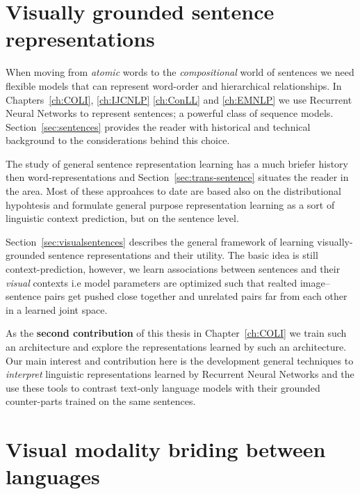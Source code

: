 \section{Visually grounded sentence representations}

When moving from \emph{atomic} words to the \emph{compositional} world of sentences we need flexible
models that can represent word-order and hierarchical relationships.  In Chapters~\ref{ch:COLI}, \ref{ch:IJCNLP}  \ref{ch:ConLL} and \ref{ch:EMNLP} 
we use Recurrent Neural Networks to represent sentences; a powerful class of  sequence models.
Section~\ref{sec:sentences} provides the reader with 
historical and technical background to the considerations behind this choice.

The study of general sentence representation learning has a much briefer history then word-representations
and Section~\ref{sec:trans-sentence} situates the reader in the area. Most of these approahces to date are 
based also on the distributional hypohtesis and formulate general purpose representation learning as a sort of
linguistic context prediction, but on the sentence level. 

Section~\ref{sec:visualsentences}
describes the general framework of learning visually-grounded sentence representations and their utility. 
The basic idea is still context-prediction, however, we learn associations between sentences and their \emph{visual} 
contexts i.e model parameters are optimized such that realted image--sentence 
pairs get pushed close together and unrelated pairs far from each other in a learned joint space.

As the \textbf{second contribution} of this thesis in Chapter~\ref{ch:COLI} 
we train such an architecture and explore the representations learned by such an architecture.
Our main interest and contribution here is the development general techniques to 
\emph{interpret} linguistic representations learned by
Recurrent Neural Networks and the use these tools to contrast text-only language 
models with their grounded counter-parts trained on the same sentences.

\section{Visual modality briding between languages}

